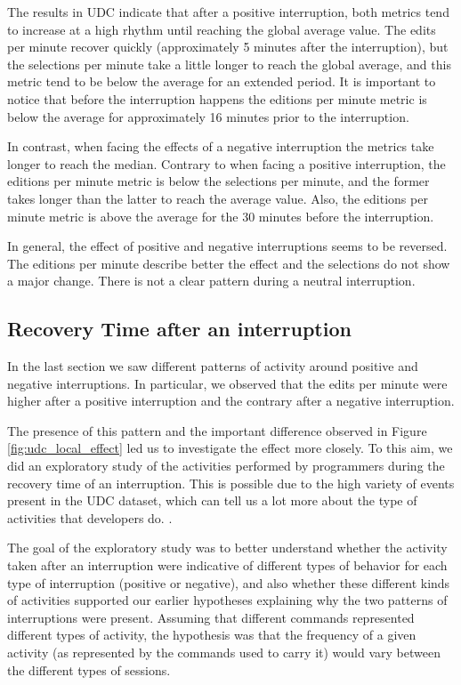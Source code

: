 \begin{table}[ht!]
\begin{tabular}{m{6cm} | m{5cm}}
		\\
	\end{tabular}
\end{table}

The results in UDC indicate that after a positive interruption, both metrics tend to increase at a high rhythm until reaching the global average value. The edits per minute recover quickly (approximately 5 minutes after the interruption), but the selections per minute take a little longer to reach the global average, and this metric tend to be below the average for an extended period. It is important to notice that before the interruption happens the editions per minute metric is below the average for approximately 16 minutes prior to the interruption.

In contrast, when facing the effects of a negative interruption the metrics take longer to reach the median. Contrary to when facing a positive interruption, the editions per minute metric is below the selections per minute, and the former takes longer than the latter to reach the average value. Also, the editions per minute metric is above the average for the 30 minutes before the interruption. 

In general, the effect of positive and negative interruptions seems to be reversed. The editions per minute describe better the effect and the selections do not show a major change. There is not a clear pattern during a neutral interruption.

\subsection{Recovery Time after an interruption}

In the last section we saw different patterns of activity around positive and negative interruptions. In particular, we observed that the edits per minute were higher after a positive interruption and the contrary after a negative interruption.

The presence of this pattern and the important difference observed in Figure \ref{fig:udc_local_effect} led us to investigate the effect more closely. To this aim, we did an exploratory study of the activities performed by programmers during the recovery time of an interruption. This is possible due to the high variety of events present in the UDC dataset, which can tell us a lot more about the type of activities that developers do. . 

The goal of the exploratory study was to better understand whether the activity taken after an interruption were indicative of different types of behavior for each type of interruption (positive or negative), and also whether these different kinds of activities supported our earlier hypotheses explaining why the two patterns of interruptions were present. Assuming that different commands represented different types of activity, the hypothesis was that the frequency of a given activity (as represented by the commands used to carry it) would vary between the different types of sessions.

